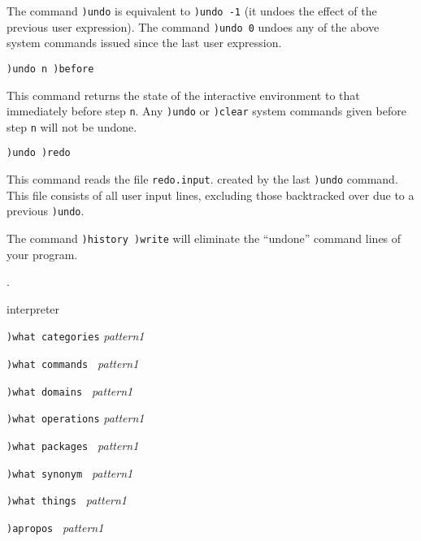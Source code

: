 {{{{{{{The command {\tt )undo} is equivalent to {\tt )undo -1} (it undoes
the effect of the previous user expression).
The command {\tt )undo 0} undoes any of the above system commands
issued since the last user expression.

\begin{verbatim}
)undo n )before
\end{verbatim}
This command returns the state of the interactive
environment to that immediately before step {\tt n}.
Any {\tt )undo} or {\tt )clear} system commands
given before step {\tt n} will not be undone.

\begin{verbatim}
)undo )redo
\end{verbatim}
This command reads the file {\tt redo.input}.
created by the last {\tt )undo} command.
This file consists of all user input lines, excluding those
backtracked over due to a previous {\tt )undo}.

The command {\tt )history )write} will eliminate the ``undone'' command
lines of your program.

\par{}
.



\par{} interpreter

\par{}
\begin{simpleList}
\item{\tt )what categories} {\it pattern1} 
\item{\tt )what commands  } {\it pattern1} 
\item{\tt )what domains   } {\it pattern1} 
\item{\tt )what operations} {\it pattern1} 
\item{\tt )what packages  } {\it pattern1} 
\item{\tt )what synonym   } {\it pattern1} 
\item{\tt )what things    } {\it pattern1} 
\item{\tt )apropos        } {\it pattern1} 
\end{simpleList}

}}}}}}}

